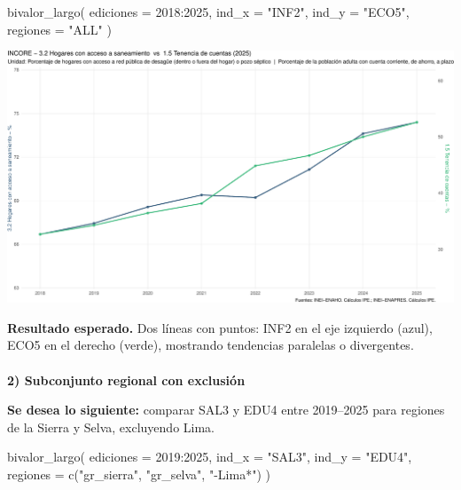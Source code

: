 \documentclass[
  11pt,
  letterpaper,
  DIV=11,
  numbers=noendperiod]{scrartcl}
\makeatletter
\let\oldparagraph\paragraph
\renewcommand{\paragraph}{
    \@ifstar
      \xxxParagraphStar
      \xxxParagraphNoStar
  }
\newcommand{\xxxParagraphStar}[1]{\oldparagraph*{#1}\mbox{}}
\newcommand{\xxxParagraphNoStar}[1]{\oldparagraph{#1}\mbox{}}
\newenvironment{Shaded}{\begin{snugshade}}{\end{snugshade}}
\newcommand{\AttributeTok}[1]{\textcolor[rgb]{0.40,0.45,0.13}{#1}}
\newcommand{\DecValTok}[1]{\textcolor[rgb]{0.68,0.00,0.00}{#1}}
\newcommand{\FunctionTok}[1]{\textcolor[rgb]{0.28,0.35,0.67}{#1}}
\newcommand{\NormalTok}[1]{\textcolor[rgb]{0.00,0.23,0.31}{#1}}
\newcommand{\SpecialCharTok}[1]{\textcolor[rgb]{0.37,0.37,0.37}{#1}}
\newcommand{\StringTok}[1]{\textcolor[rgb]{0.13,0.47,0.30}{#1}}
\makeatother
\begin{document}
\begin{Shaded}
\begin{Highlighting}[]
\FunctionTok{bivalor\_largo}\NormalTok{(}
  \AttributeTok{ediciones =} \DecValTok{2018}\SpecialCharTok{:}\DecValTok{2025}\NormalTok{,}
  \AttributeTok{ind\_x     =} \StringTok{"INF2"}\NormalTok{,}
  \AttributeTok{ind\_y     =} \StringTok{"ECO5"}\NormalTok{,}
  \AttributeTok{regiones  =} \StringTok{"ALL"}
\NormalTok{)}
\end{Highlighting}
\end{Shaded}

\includegraphics{Manual_files/figure-pdf/unnamed-chunk-106-1.pdf}

\textbf{Resultado esperado.} Dos líneas con puntos: INF2 en el eje
izquierdo (azul), ECO5 en el derecho (verde), mostrando tendencias
paralelas o divergentes.

\paragraph{\texorpdfstring{\textbf{2) Subconjunto regional con
exclusión}}{2) Subconjunto regional con exclusión}}\label{subconjunto-regional-con-exclusiuxf3n}

\textbf{Se desea lo siguiente:} comparar SAL3 y EDU4 entre 2019--2025
para regiones de la Sierra y Selva, excluyendo Lima.

\begin{Shaded}
\begin{Highlighting}[]
\FunctionTok{bivalor\_largo}\NormalTok{(}
  \AttributeTok{ediciones =} \DecValTok{2019}\SpecialCharTok{:}\DecValTok{2025}\NormalTok{,}
  \AttributeTok{ind\_x     =} \StringTok{"SAL3"}\NormalTok{,}
  \AttributeTok{ind\_y     =} \StringTok{"EDU4"}\NormalTok{,}
  \AttributeTok{regiones  =} \FunctionTok{c}\NormalTok{(}\StringTok{"gr\_sierra"}\NormalTok{, }\StringTok{"gr\_selva"}\NormalTok{, }\StringTok{"{-}Lima*"}\NormalTok{)}
\NormalTok{)}
\end{Highlighting}
\end{Shaded}
\end{document}
